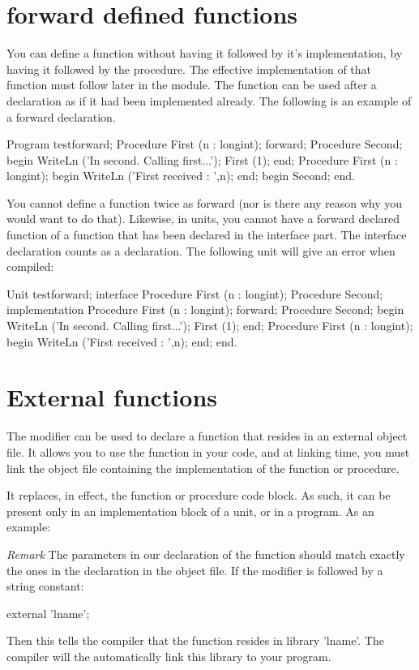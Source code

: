 \documentclass{report}
\begin{document}
\section{forward defined functions}
You can define a function without having it followed by it's implementation,
by having it followed by the  procedure. The effective 
implementation of that function must follow later in the module.
The function can be used after a  declaration as if it had been
implemented already.
The following is an example of a forward declaration.
\begin{listing}
Program testforward;
Procedure First (n : longint); forward;
Procedure Second;
begin
  WriteLn ('In second. Calling first...');
  First (1);
end;
Procedure First (n : longint);
begin
  WriteLn ('First received : ',n);
end;
begin
  Second;
end.
\end{listing}
You cannot define a function twice as forward (nor is there any reason why
you would want to do that).
Likewise, in units, you cannot have a forward declared function of a 
function that has been declared in the interface part. The interface 
declaration counts as a  declaration.
The following unit will give an error when compiled:
\begin{listing}
Unit testforward;
interface
Procedure First (n : longint);
Procedure Second;
implementation
Procedure First (n : longint); forward;
Procedure Second;
begin
  WriteLn ('In second. Calling first...');
  First (1);
end;
Procedure First (n : longint);
begin
  WriteLn ('First received : ',n);
end;
end.
\end{listing}
\section{External functions}
\label{se:external}
The  modifier can be used to declare a function that resides in
an external object file. It allows you to use the function in
your code, and at linking time, you must link the object file containing the
implementation of the function or procedure.

It replaces, in effect, the function or procedure code block. As such, it
can be present only in an implementation block of a unit, or in a program. 
As an example:
{\em Remark} The parameters in our declaration of the  function 
should match exactly the ones in the declaration in the object file.
If the  modifier is followed by a string constant:
\begin{listing}
external 'lname';
\end{listing}
Then this tells the compiler that the function resides in library 
'lname'. The compiler will the automatically link this library to 
your program.
 
\end{document}
